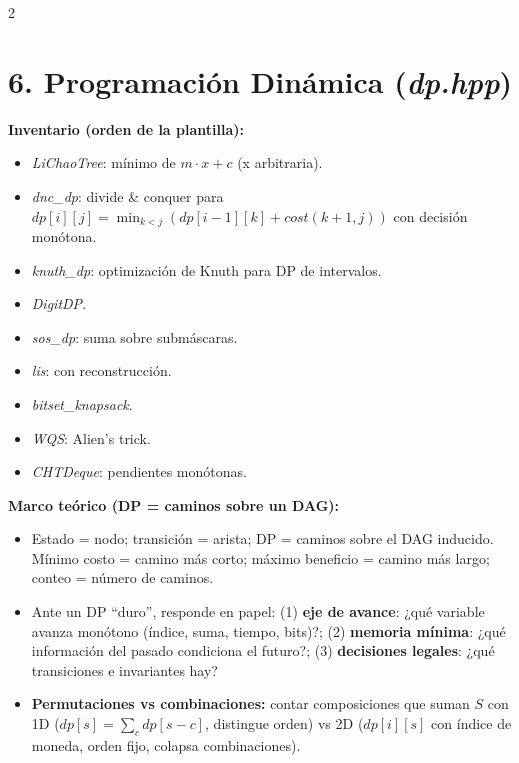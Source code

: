 \documentclass[10pt]{article}
\begin{document}
\begin{multicols}{2}
\section*{6. Programación Dinámica (\textit{dp.hpp})}

\textbf{Inventario (orden de la plantilla):}
\begin{itemize}\setlength{\itemsep}{1pt}
  \item \textit{LiChaoTree}: mínimo de $m \cdot x + c$ (x arbitraria).
  \item \textit{dnc\_dp}: divide \& conquer para $dp[i][j] = \min_{k<j}(dp[i-1][k] + cost(k+1, j))$ con decisión monótona.
  \item \textit{knuth\_dp}: optimización de Knuth para DP de intervalos.
  \item \textit{DigitDP}.
  \item \textit{sos\_dp}: suma sobre submáscaras.
  \item \textit{lis}: con reconstrucción.
  \item \textit{bitset\_knapsack}.
  \item \textit{WQS}: Alien's trick.
  \item \textit{CHTDeque}: pendientes monótonas.
\end{itemize}

\textbf{Marco teórico (DP = caminos sobre un DAG):}
\begin{itemize}\setlength{\itemsep}{1pt}
  \item Estado = nodo; transición = arista; DP = caminos sobre el DAG inducido. Mínimo costo = camino más corto; máximo beneficio = camino más largo; conteo = número de caminos.
  \item Ante un DP ``duro'', responde en papel: (1) \textbf{eje de avance}: ¿qué variable avanza monótono (índice, suma, tiempo, bits)?; (2) \textbf{memoria mínima}: ¿qué información del pasado condiciona el futuro?; (3) \textbf{decisiones legales}: ¿qué transiciones e invariantes hay?
  \item \textbf{Permutaciones vs combinaciones:} contar composiciones que suman $S$ con 1D ($dp[s] = \sum_c dp[s-c]$, distingue orden) vs 2D ($dp[i][s]$ con índice de moneda, orden fijo, colapsa combinaciones).
\end{itemize}


\end{multicols}
\end{document}
